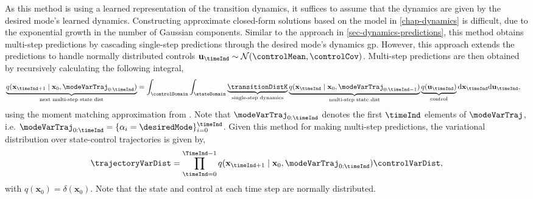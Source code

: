 \documentclass{mimosis-class/mimosis}
\numberwithin{equation}{chapter}
\newcommand{\state}{\ensuremath{\mathbf{x}}}
\newcommand{\control}{\ensuremath{\mathbf{u}}}
\newcommand{\modeVar}{\ensuremath{\alpha}}
\begin{document}
{As this method is using a learned representation of the transition dynamics,
it suffices to assume that the dynamics are given by the desired mode's learned dynamics.
Constructing approximate closed-form solutions based on the model in \cref{chap-dynamics}
is difficult, due to the exponential growth in the number of Gaussian components.
Similar to the approach in \cref{sec-dynamics-predictions}, this method obtains multi-step
predictions by cascading single-step predictions through the desired mode's dynamics \acrshort{gp}.
However, this approach extends the predictions to handle normally distributed controls
\(\control_{\timeInd} \sim \mathcal{N}(\controlMean, \controlCov)\).
Multi-step predictions are then obtained by recursively calculating the following integral,
\begin{align} \label{eq-state-control-unc-prop-inf}
\underbrace{q(\state_{\timeInd+1} \mid \state_0, \modeVarTraj_{0:\timeInd})}_{\text{next multi-step state dist}}
&= \int_{\controlDomain} \int_{\stateDomain}
\underbrace{\transitionDistK}_{\text{single-step dynamics}}
\underbrace{q(\state_\timeInd \mid \state_{0}, \modeVarTraj_{0:\timeInd-1})}_{\text{multi-step state dist}}
\underbrace{q(\control_{\timeInd})}_{\text{control}}
\text{d}\state_{\timeInd}
\text{d}\control_{\timeInd},
\end{align}
using the moment matching approximation from \citep{kussGaussian2006}.
Note that \(\modeVarTraj_{0:\timeInd}\) denotes the first \(\timeInd\) elements of \(\modeVarTraj\), i.e.
\(\modeVarTraj_{0:\timeInd} = \{ \modeVar_i=\desiredMode\}_{i=0}^{\timeInd}\).
Given this method for making multi-step predictions, the variational distribution over state-control trajectories is
given by,
\begin{align} \label{eq-}
\trajectoryVarDist
= \prod_{\timeInd=0}^{\TimeInd-1}
q(\state_{\timeInd+1} \mid \state_0, \modeVarTraj_{0:\timeInd})
\controlVarDist,
\end{align}
with \(q(\state_0) = \delta(\state_0)\).
Note that the state and control at each time step are normally distributed.

}
\end{document}
